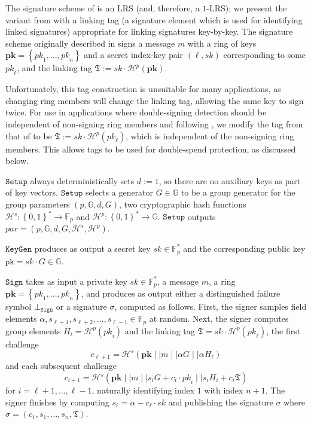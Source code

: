 \documentclass[draft]{llncs} %
\begin{document}
\begin{example}\label{ex:lsag}
The signature scheme of \cite{liu} is an LRS (and, therefore, a $1$-LRS); we present the variant from \cite{van2013cryptonote} with a linking tag (a signature element which is used for identifying linked signatures) appropriate for linking signatures key-by-key. The signature scheme originally described in \cite{liu} signs a message $m$ with a ring of keys $\textbf{pk} = \left\{\textit{pk}_1, \ldots, \textit{pk}_n\right\}$ and a secret index-key pair $(\ell, \textit{sk})$ corresponding to some $\textit{pk}_\ell$, and the linking tag $\mathfrak{T} := \textit{sk} \cdot \mathcal{H}^p(\textbf{pk})$.

Unfortunately, this tag construction is unsuitable for many applications, as changing ring members will change the linking tag, allowing the same key to sign twice. For use in applications where double-signing detection should be independent of non-signing ring members and following \cite{van2013cryptonote}, we modify the tag from that of \cite{liu} to be $\mathfrak{T} := \textit{sk} \cdot \mathcal{H}^p(\textit{pk}_\ell)$, which is independent of the non-signing ring members. This allows tags to be used for double-spend protection, as discussed below.

$\texttt{Setup}$ always deterministically sets $d := 1$, so there are no auxiliary keys as part of key vectors. $\texttt{Setup}$ selects a generator $G \in \mathbb{G}$ to be a group generator for the group parameters $(p, \mathbb{G}, d, G)$, two cryptographic hash functions $\mathcal{H}^s:\left\{0,1\right\}^* \to \mathbb{F}_p$ and $\mathcal{H}^p:\left\{0,1\right\}^* \to \mathbb{G}$. $\texttt{Setup}$ outputs $\textit{par} = (p, \mathbb{G}, d, G, \mathcal{H}^s, \mathcal{H}^p)$.

$\texttt{KeyGen}$ produces as output a secret key $\textit{sk} \in \mathbb{F}_p^*$ and the corresponding public key $\texttt{pk} = \textit{sk}\cdot G\in \mathbb{G}$.

$\texttt{Sign}$ takes as input a private key $\textit{sk} \in \mathbb{F}_p^*$, a message $m$, a ring $\textbf{pk} = \left\{\textit{pk}_1, \ldots, \textit{pk}_n\right\}$, and produces as output either a distinguished failure symbol $\bot_{\texttt{Sign}}$ or a signature $\sigma$, computed as follows. First, the signer samples field elements $\alpha, s_{\ell+1}, s_{\ell+2}, \ldots, s_{\ell-1} \in \mathbb{F}_p$ at random. Next, the signer computes group elements $H_i = \mathcal{H}^p(\textit{pk}_i)$ and the linking tag $\mathfrak{T} = \textit{sk} \cdot \mathcal{H}^p(\textit{pk}_\ell)$, the first challenge $$c_{\ell+1}  = \mathcal{H}^s(\textbf{pk} \mid \mid m \mid \mid \alpha G \mid \mid \alpha H_\ell)$$ and each subsequent challenge $$c_{i+1} = \mathcal{H}^s(\textbf{pk} \mid \mid m \mid \mid s_i G + c_i \cdot \textit{pk}_i \mid \mid s_i H_i + c_i \mathfrak{T})$$ for $i = \ell+1, \ldots, \ell-1$, naturally identifying index $1$ with index $n+1$. The signer finishes by computing $s_\ell = \alpha - c_\ell \cdot \textit{sk}$ and publishing the signature $\sigma$ where $\sigma = (c_1, s_1, \ldots, s_n, \mathfrak{T})$.


\end{example}
\end{document}

